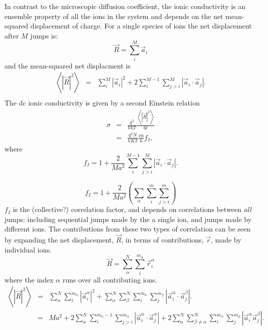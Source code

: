\documentclass[aps,prl,twocolumn,superscriptaddress,reprint]{revtex4-1}
\begin{document}
In contrast to the microscopic diffusion coefficient, the ionic conductivity is an ensemble property of all the ions in the system and depends on the net mean-squared displacement of charge. For a single species of ions the net displacement after $M$ jumps is:
\begin{equation}
  \vec{R} = \sum_i^M \vec{a}_i
\end{equation}
and the mean-squared net displacment is
\begin{eqnarray}
  \left<\left|\vec{R}\right|^2\right> & = & \sum_i^M \left|\vec{a}_i\right|^2 + 2\sum_i^{M-1}\sum_{j>i}^M\left|\vec{a}_i\cdot\vec{a}_j\right|. \\
\end{eqnarray}
The dc ionic conductivity is given by a second Einstein relation
\begin{eqnarray}
  \sigma & = & \frac{q^2}{VkT}\frac{\left<\left|\vec{R}\right|^2\right>}{6t} \\
         & = & \frac{q^2 N}{VKT}\frac{\nu a}{6}f_I,
\end{eqnarray}
where
\begin{equation}
  f_I = 1 + \frac{2}{Ma^2}\sum_i^{M-1}\sum_{j>i}^M\left|\vec{a}_i\cdot\vec{a}_j\right|.
\end{equation}

\begin{equation}
  f_I = 1 + \frac{2}{Ma^2}\left( \sum_\alpha\sum_i^m\sum_{j>i}^m\right)
\end{equation}
$f_I$ is the (collective?) correlation factor, and depends on correlations between \emph{all} jumps: including sequential jumps made by the a single ion, and jumps made by different ions. The contributions from these two types of correlation can be seen by expanding the net displacement, $\vec{R}$, in terms of contributions, $\vec{r}$, made by individual ions.
\begin{equation}
  \vec{R} = \sum_\alpha^N \sum_i^{m_\alpha}\vec{r}_i^\alpha
\end{equation}
where the index $\alpha$ runs over all contributing ions.
\begin{eqnarray}
  \left<\left|\vec{R}\right|^2\right> & = & \sum_\alpha^N\sum_i^{m_\alpha} \left|\vec{a}_i^\alpha\right|^2 + \sum_\alpha^N\sum_\beta^N\sum_i^{m_\alpha}\sum_j^{m_\beta}\left|\vec{a}_i^\alpha\cdot\vec{a}_j^\beta\right|. \\
  & = & Ma^2 + 2\sum_\alpha^N\sum_i^{m_\alpha-1}\sum_{j>i}^{m_\alpha}\left|\vec{a}_i^\alpha\cdot\vec{a}_j^\alpha\right| + 2\sum_\alpha^N\sum_{\beta\ne\alpha}^N\sum_i^{m_\alpha}\sum_j^{m_\beta}\left|\vec{a}_i^\alpha\vec{a}_j^\beta\right|.
\end{eqnarray}




\end{document}
